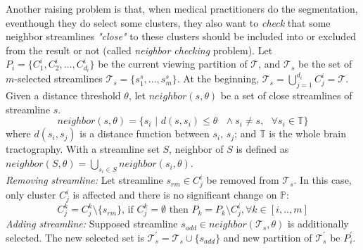 Another raising problem is that, when medical practitioners do the segmentation, eventhough they do select some clusters, they also want to \textit{check} that some neighbor streamlines \textit{"close"} to these clusters should be included into or excluded from the result or not (called \textit{neighbor checking} problem). Let $P_{i} = \{C_{1}^{i}, C_{2}^{i}, \ldots, C_{d_{i}}^{i}\}$ be the current viewing partition of $\mathcal{T}$, and $\mathcal{T}_{s}$ be the set of $m$-selected streamlines $ \mathcal{T}_s  = \{s_1^s,\ldots,s_m^s\}$. At the beginning, $\mathcal{T}_s = \bigcup_{j=1}^{d_i} C_j^i = \mathcal{T}$. %
Given a distance threshold $\theta$, let $\mathit{neighbor}(s,\theta)$ be a set of close streamlines of streamline $s$. 
\begin{equation}
\label{eq:neighbor_s}
\mathit{neighbor}(s,\theta) = \{s_i \mbox{ |  }d(s,s_i) \leq \theta \mbox{ } \wedge s_i \neq s, \mbox{  }\forall s_i \in \mathbb{T} \}
\end{equation}
where $d(s_i,s_j)$ is a distance function between $s_i$, $s_j$; and $\mathbb{T}$ is the whole brain tractography. With a streamline set $S$, neighbor of $S$ is defined as $\mathit{neighbor}(S,\theta) = \bigcup_{s_i \in S}\mathit{neighbor}(s_i,\theta)$.
\\\textit{Removing streamline:} Let streamline $s_{rm} \in C_{j}^{i} $ be removed from $\mathcal{T}_{s}$. In this case, only cluster $C_{j}^{i}$ is affected and there is no significant change on $\mathbb{P}$:
\begin{equation}
\label{eq:remove_s}
C_{j}^{k} = C_{j}^{k} \setminus \{ s_{rm}\} \mbox{, if } C_{j}^{k} =\emptyset \mbox{ then }  P_{k} = P_{k} \setminus C_{j}^{i}, \forall k \in [i,..,m]
\end{equation}
\textit{Adding streamline:} Supposed streamline $s_{add} \in \mathit{neighbor}(\mathcal{T}_{s},\theta)$ is additionally selected. The new selected set is $\mathcal{T}_{s}^{'} = \mathcal{T}_{s} \cup \{s_{add}\}$ and new partition of $\mathcal{T}_{s}^{'}$ be $P_{i}^{'}$.
